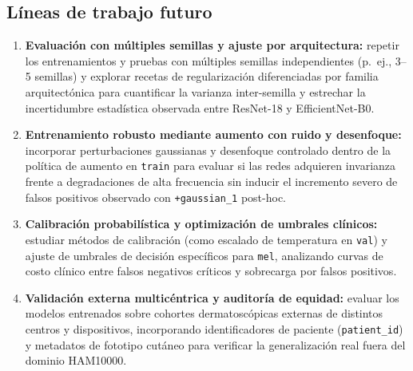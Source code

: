 \subsection{Líneas de trabajo futuro}
\begin{enumerate}[leftmargin=1.5em,itemsep=4pt]
\item \textbf{Evaluación con múltiples semillas y ajuste por arquitectura:} repetir los entrenamientos y pruebas con múltiples semillas independientes (p.\ ej., 3--5 semillas) y explorar recetas de regularización diferenciadas por familia arquitectónica para cuantificar la varianza inter-semilla y estrechar la incertidumbre estadística observada entre ResNet-18 y EfficientNet-B0.
\item \textbf{Entrenamiento robusto mediante aumento con ruido y desenfoque:} incorporar perturbaciones gaussianas y desenfoque controlado dentro de la política de aumento en \texttt{train} para evaluar si las redes adquieren invarianza frente a degradaciones de alta frecuencia sin inducir el incremento severo de falsos positivos observado con \texttt{+gaussian\_1} post-hoc.
\item \textbf{Calibración probabilística y optimización de umbrales clínicos:} estudiar métodos de calibración (como escalado de temperatura en \texttt{val}) y ajuste de umbrales de decisión específicos para \texttt{mel}, analizando curvas de costo clínico entre falsos negativos críticos y sobrecarga por falsos positivos.
\item \textbf{Validación externa multicéntrica y auditoría de equidad:} evaluar los modelos entrenados sobre cohortes dermatoscópicas externas de distintos centros y dispositivos, incorporando identificadores de paciente (\texttt{patient\_id}) y metadatos de fototipo cutáneo para verificar la generalización real fuera del dominio HAM10000.
\end{enumerate}
